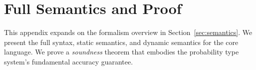 \documentclass[10pt,nocopyrightspace,preprint]{sigplanconf}
\begin{document}



\clearpage
\appendix
\section{Full Semantics and Proof}
\label{app:semantics}

This appendix expands on the formalism overview in
Section~\ref{sec:semantics}.
We present the full syntax, static semantics, and dynamic semantics for the
core \lang language.
We prove a \emph{soundness} theorem that embodies the probability type
system's fundamental accuracy guarantee.


\end{document}
